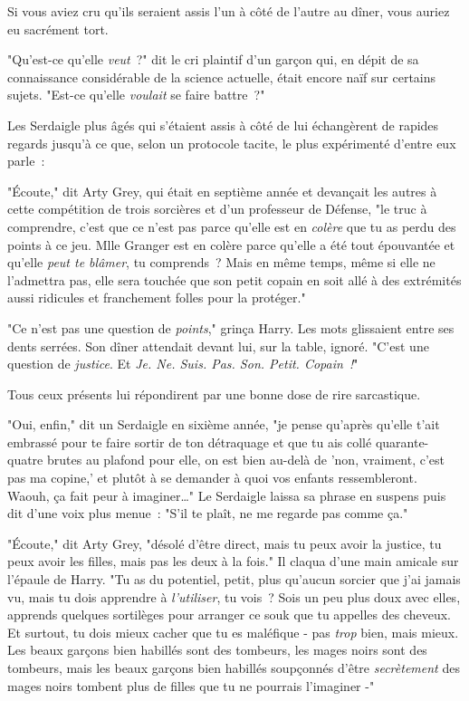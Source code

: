 \later

Si vous aviez cru qu'ils seraient assis l'un à côté de l'autre au dîner, vous auriez eu sacrément tort.

"Qu'est-ce qu'elle \emph{veut}~?" dit le cri plaintif d'un garçon qui, en dépit de sa connaissance considérable de la science actuelle, était encore naïf sur certains sujets. "Est-ce qu'elle \emph{voulait} se faire battre~?"

Les Serdaigle plus âgés qui s'étaient assis à côté de lui échangèrent de rapides regards jusqu'à ce que, selon un protocole tacite, le plus expérimenté d'entre eux parle~:

"Écoute," dit Arty Grey, qui était en septième année et devançait les autres à cette compétition de trois sorcières et d'un professeur de Défense, "le truc à comprendre, c'est que ce n'est pas parce qu'elle est en \emph{colère} que tu as perdu des points à ce jeu. Mlle Granger est en colère parce qu'elle a été tout épouvantée et qu'elle \emph{peut te blâmer}, tu comprends~? Mais en même temps, même si elle ne l'admettra pas, elle sera touchée que son petit copain en soit allé à des extrémités aussi ridicules et franchement folles pour la protéger."

"Ce n'est pas une question de \emph{points}," grinça Harry. Les mots glissaient entre ses dents serrées. Son dîner attendait devant lui, sur la table, ignoré. "C'est une question de \emph{justice}. Et \emph{Je. Ne. Suis. Pas. Son. Petit. Copain~!}"

Tous ceux présents lui répondirent par une bonne dose de rire sarcastique.

"Oui, enfin," dit un Serdaigle en sixième année, "je pense qu'après qu'elle t'ait embrassé pour te faire sortir de ton détraquage et que tu ais collé quarante-quatre brutes au plafond pour elle, on est bien au-delà de 'non, vraiment, c'est pas ma copine,' et plutôt à se demander à quoi vos enfants ressembleront. Waouh, ça fait peur à imaginer…" Le Serdaigle laissa sa phrase en suspens puis dit d'une voix plus menue~: "S'il te plaît, ne me regarde pas comme ça."

"Écoute," dit Arty Grey, "désolé d'être direct, mais tu peux avoir la justice, tu peux avoir les filles, mais pas les deux à la fois." Il claqua d'une main amicale sur l'épaule de Harry. "Tu as du potentiel, petit, plus qu'aucun sorcier que j'ai jamais vu, mais tu dois apprendre à \emph{l'utiliser}, tu vois~? Sois un peu plus doux avec elles, apprends quelques sortilèges pour arranger ce souk que tu appelles des cheveux. Et surtout, tu dois mieux cacher que tu es maléfique - pas \emph{trop} bien, mais mieux. Les beaux garçons bien habillés sont des tombeurs, les mages noirs sont des tombeurs, mais les beaux garçons bien habillés soupçonnés d'être \emph{secrètement} des mages noirs tombent plus de filles que tu ne pourrais l'imaginer -"

